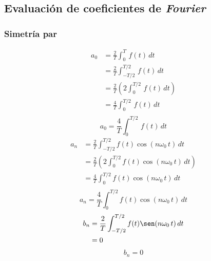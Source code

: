 \subsection{Evaluación de coeficientes de \emph{Fourier}}
\subsubsection{Simetría par}
\begin{equation*}
\begin{split}
    a_0
        &=\frac{2}{T}\int_0^T\,f(t)\,dt\\
        &=\frac{2}{T}\int_{-T/2}^{T/2}\,f(t)\,dt\\
        &=\frac{2}{T}\left(2\int_0^{T/2}\,f(t)\,dt\right)\\
        &=\frac{4}{T}\int_0^{T/2}\,f(t)\,dt\\
\end{split}
\end{equation*}
\begin{equation}
    a_0=\frac{4}{T}\int_0^{T/2}\,f(t)\,dt
\end{equation}
\begin{equation*}
\begin{split}
    a_n
        &=\frac{2}{T}\int_{-T/2}^{T/2}f(t)\cos(n\omega_0\,t)\,dt\\
        &=\frac{2}{T}\left(2\int_0^{T/2}f(t)\cos(n\omega_0\,t)\,dt\right)\\
        &=\frac{4}{T}\int_0^{T/2}f(t)\cos(n\omega_0\,t)\,dt\\
\end{split}
\end{equation*}
\begin{equation}
    a_n=\frac{4}{T}\int_0^{T/2}f(t)\cos(n\omega_0\,t)\,dt
\end{equation}
\begin{equation*}
\begin{split}
    b_n
        &=\frac{2}{T}\int_{-T/2}^{T/2}f(t)\sen(n\omega_0\,t)\,dt\\
        &=0\\
\end{split}
\end{equation*}
\begin{equation}
    b_n=0
\end{equation}

